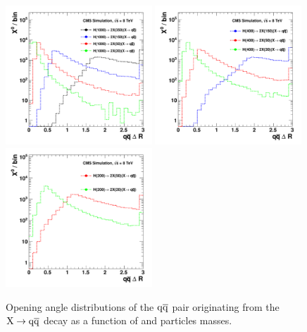 \begin{figure}[htbp]
\centering
\includegraphics[width=0.49\textwidth]{plots/signal/dRH1000.pdf}
\includegraphics[width=0.49\textwidth]{plots/signal/dRH400.pdf}
\includegraphics[width=0.49\textwidth]{plots/signal/dRH200.pdf}
\caption{Opening angle distributions of the $\mathrm{q}\overline{\mathrm{q}}$ pair originating from the $\X \to \qq$ decay as a function
of \Higgs and \X particles masses. \label{fig:sigdR}}
\end{figure}


